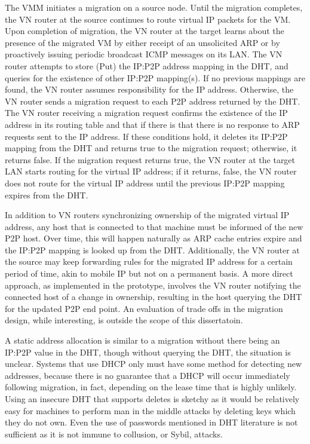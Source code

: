 The VMM initiates a migration on a source node. Until the migration completes,
the VN router at the source continues to route virtual IP packets for the VM.
Upon completion of migration, the VN router at the target learns about the
presence of the migrated VM by either receipt of an unsolicited ARP or by
proactively issuing periodic broadcast ICMP messages on its LAN.  The VN router
attempts to store (Put) the IP:P2P address mapping in the DHT, and queries for
the existence of other IP:P2P mapping(s). If no previous mappings are found,
the VN router assumes responsibility for the IP address. Otherwise, the VN
router sends a migration request to each P2P address returned by the DHT. The
VN router receiving a migration request confirms the existence of the IP
address in its routing table and that if there is that there is no response to
ARP requests sent to the IP address.  If these conditions hold, it deletes its
IP:P2P mapping from the DHT and returns true to the migration request;
otherwise, it returns false. If the migration request returns true, the VN
router at the target LAN starts routing for the virtual IP address; if it
returns, false, the VN router does not route for the virtual IP address until
the previous IP:P2P mapping expires from the DHT.

In addition to VN routers synchronizing ownership of the migrated virtual IP
address, any host that is connected to that machine must be informed of the new
P2P host.  Over time, this will happen naturally as ARP cache entries expire
and the IP:P2P mapping is looked up from the DHT.  Additionally, the VN router
at the source may keep forwarding rules for the migrated IP address for a
certain period of time, akin to mobile IP but not on a permanent basis.  A more
direct approach, as implemented in the prototype, involves the VN router
notifying the connected host of a change in ownership, resulting in the host
querying the DHT for the updated P2P end point.  An evaluation of trade offs in
the migration design, while interesting, is outside the scope of this
dissertatoin. 

A static address allocation is similar to a migration without there being an
IP:P2P value in the DHT, though without querying the DHT, the situation is
unclear.  Systems that use DHCP only must have some method for detecting new
addresses, because there is no guarantee that a DHCP will occur immediately
following migration, in fact, depending on the lease time that is highly
unlikely.  Using an insecure DHT that supports deletes is sketchy as it would
be relatively easy for machines to perform man in the middle attacks by
deleting keys which they do not own.  Even the use of passwords mentioned in
DHT literature is not sufficient as it is not immune to collusion, or Sybil,
attacks.

